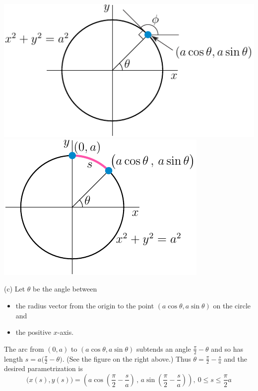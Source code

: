 \begin{solution}
\begin{center}
       \includegraphics{fig/parCirclePhi.pdf}\quad
       \includegraphics{fig/parCircleS.pdf}
\end{center}


(c) Let $\theta$ be the angle between 
\begin{itemize}\itemsep1pt \parskip0pt 
\item the radius vector from the origin to the point 
$(a\cos\theta,a\sin\theta)$  on the circle and 
\item
the positive $x$-axis. 
\end{itemize} 
The arc from $(0,a)$ to $(a\cos\theta,a\sin\theta)$ 
subtends an angle $\frac{\pi}{2}-\theta$ and so
has length $s=a\big(\frac{\pi}{2}-\theta\big)$. (See the figure
on the right above.) Thus $\theta=\frac{\pi}{2}-\frac{s}{a}$
and the desired parametrization is
\begin{equation*}
\big(x(s),y(s)\big)
=\left(a\cos\left(\frac{\pi}{2}-\frac{s}{a}\right)\,,\,
           a\sin\left(\frac{\pi}{2}-\frac{s}{a}\right)\right)
,\ 0\le s\le\frac{\pi}{2}a
\end{equation*}
\end{solution}


